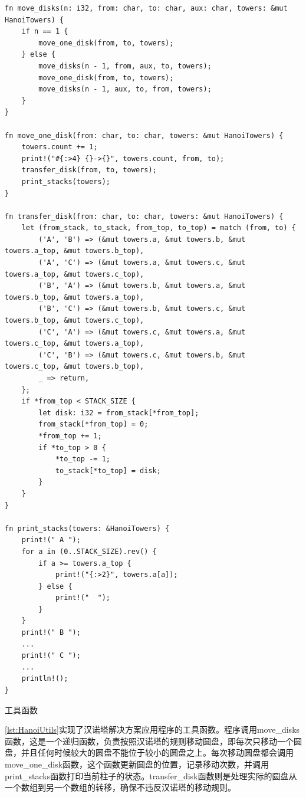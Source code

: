 \begin{listing}[htbp]
    \begin{verbatim}
fn move_disks(n: i32, from: char, to: char, aux: char, towers: &mut HanoiTowers) {
    if n == 1 {
        move_one_disk(from, to, towers);
    } else {
        move_disks(n - 1, from, aux, to, towers);
        move_one_disk(from, to, towers);
        move_disks(n - 1, aux, to, from, towers);
    }
}

fn move_one_disk(from: char, to: char, towers: &mut HanoiTowers) {
    towers.count += 1;
    print!("#{:>4} {}->{}", towers.count, from, to);
    transfer_disk(from, to, towers);
    print_stacks(towers);
}

fn transfer_disk(from: char, to: char, towers: &mut HanoiTowers) {
    let (from_stack, to_stack, from_top, to_top) = match (from, to) {
        ('A', 'B') => (&mut towers.a, &mut towers.b, &mut towers.a_top, &mut towers.b_top),
        ('A', 'C') => (&mut towers.a, &mut towers.c, &mut towers.a_top, &mut towers.c_top),
        ('B', 'A') => (&mut towers.b, &mut towers.a, &mut towers.b_top, &mut towers.a_top),
        ('B', 'C') => (&mut towers.b, &mut towers.c, &mut towers.b_top, &mut towers.c_top),
        ('C', 'A') => (&mut towers.c, &mut towers.a, &mut towers.c_top, &mut towers.a_top),
        ('C', 'B') => (&mut towers.c, &mut towers.b, &mut towers.c_top, &mut towers.b_top),
        _ => return,
    };
    if *from_top < STACK_SIZE {
        let disk: i32 = from_stack[*from_top];
        from_stack[*from_top] = 0;
        *from_top += 1;
        if *to_top > 0 {
            *to_top -= 1;
            to_stack[*to_top] = disk;
        }
    }
}

fn print_stacks(towers: &HanoiTowers) {
    print!(" A ");
    for a in (0..STACK_SIZE).rev() {
        if a >= towers.a_top {
            print!("{:>2}", towers.a[a]);
        } else {
            print!("  ");
        }
    }
    print!(" B ");
    ...
    print!(" C ");
    ...
    println!();
}
    \end{verbatim}
    \caption{工具函数}\label{lst:HanoiUtils}
\end{listing}

\cref{lst:HanoiUtils}实现了汉诺塔解决方案应用程序的工具函数。程序调用move\_disks函数，这是一个递归函数，负责按照汉诺塔的规则移动圆盘，即每次只移动一个圆盘，并且任何时候较大的圆盘不能位于较小的圆盘之上。每次移动圆盘都会调用move\_one\_disk函数，这个函数更新圆盘的位置，记录移动次数，并调用print\_stacks函数打印当前柱子的状态。transfer\_disk函数则是处理实际的圆盘从一个数组到另一个数组的转移，确保不违反汉诺塔的移动规则。


